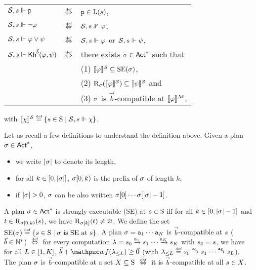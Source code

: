 \documentclass[envcountsame,a4paper,12pt]{llncs}
\renewcommand{\emptyset}{\varnothing}
\begin{document}
   \begin{nscenter}
     \begin{tabular}{@{}lcl@{}}
       $\mathcal{S},s \Vdash \mathtt{p}$ & $\iffdef$ & $\mathtt{p} \in\operatorname{L}(s)$, \\
       $\mathcal{S},s \Vdash \neg \varphi$ & $\iffdef$ & $\mathcal{S},s \nVdash\varphi$, \\ 
       $\mathcal{S},s \Vdash \varphi \vee \psi $ & $\iffdef$ & $\mathcal{S},s \Vdash \varphi 
       \,\mbox{ or }\, \mathcal{S},s \Vdash\psi$, \\
       $\mathcal{S},s \Vdash {\operatorname{\sf Kh}}^{\vec{b}}(\varphi,\psi)$ & $\iffdef$  & there exists $\sigma\in{\rm \sf Act}^*$ such that \\
                                    & & 
                                                            (1) $\llbracket \varphi  \rrbracket^{\mathcal{S}}\subseteq\operatorname{SE}(\sigma)$, \\
       & &                     (2) $\operatorname{R}_\sigma(\llbracket \varphi \rrbracket^{\mathcal{S}}) \subseteq \llbracket \psi \rrbracket^{\mathcal{S}}$ and \\
       & &                     (3) $\sigma$ is $\vec{b}$-compatible at $\llbracket \varphi \rrbracket^{\mathcal{M}}$, 
     \end{tabular}
   \end{nscenter}
    with $\truthset{\modlts}{\aformulater} \egdef \csetc{\astate}{ \states}{\modlts,\astate\models \aformulater}$. 

    Let us recall a few definitions to understand the definition above.
    Given a plan $\sigma \in {\rm \sf Act}^*$,
    \begin{itemize}
    \item we write $|\sigma|$ to denote its length,
    \item for all $k \in [0,|\sigma|]$, $\sigma[0,k)$ is the prefix of
      $\sigma$ of length $k$,
    \item if $|\sigma| > 0$, $\sigma$ can be also written $\sigma[0] \cdots
      \sigma[|\sigma|-1]$. 
    \end{itemize}
    A plan $\sigma \in {\rm \sf Act}^*$ is 
    strongly executable (SE) at $s \in  \operatorname{S}$ 
    iff 
    for all $k \in [0,|\sigma|-1]$ and  $t \in \operatorname{R}_{\sigma[0,k)}(s)$, 
    we have $\R_{\aplan[k]}(\astatebis) \neq \emptyset$.
     We define the set $\stexec(\aplan) \egdef \cset{ \astate \in \states \mid \aplan \mbox{ is SE at }\astate}$.
     A plan $\sigma = \mathtt{a}_1 \cdots \mathtt{a}_K$ is $\vec{b}$-compatible at $s$ ($\vec{b} \in \mathbb{N}^r$) $\equivdef$ for every computation
     $\acomputation = \astate_0 \step{\aaction_1} \astate_1 \cdots 
     \step{\aaction_K} \astate_K$ with $s_0 = s$, we have
     for all $L \in [1,K]$, $\vec{b} + \wf(\acomputation_{\leq L}) \geq \vec{0}$ (with
     $\acomputation_{\leq L} \egdef \astate_0 \step{\aaction_1} \astate_1 \cdots 
     \step{\aaction_L} \astate_L$). The plan $\sigma$ is $\vec{b}$-compatible at a set 
      $X \subseteq\operatorname{S}$ $\equivdef$ it is $\vec{b}$-compatible at all $s\in X$.
\end{document}
